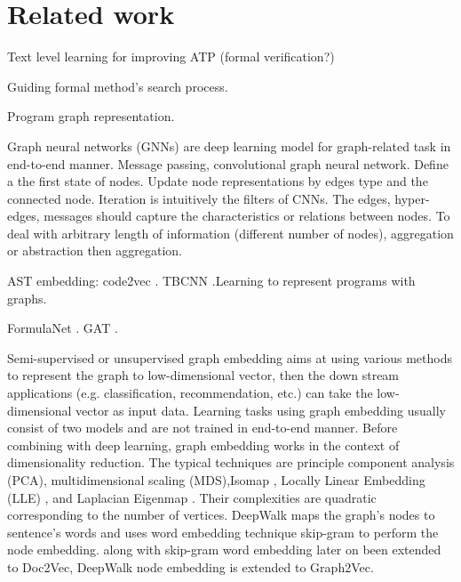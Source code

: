 \documentclass{article}
\begin{document}
\section{Related work}

Text level learning for improving ATP (formal verification?) \cite{NIPS2016_6280}

Guiding formal method's search process.

Program graph representation.

Graph neural networks (GNNs) are deep learning model for graph-related task in end-to-end manner. Message passing, convolutional graph neural network.
Define a the first state of nodes. Update node representations by edges type and the connected node. Iteration is intuitively the filters of CNNs.
The edges, hyper-edges, messages should capture the characteristics or relations between nodes.
To deal with arbitrary length of information (different number of nodes), aggregation or abstraction then aggregation.

AST embedding: code2vec \cite{Alon:2019:CLD:3302515.3290353}. TBCNN \cite{DBLP:journals/corr/MouLJZW14}.Learning to represent programs with graphs\cite{DBLP:journals/corr/abs-1711-00740}.


FormulaNet \cite{NIPS2017_6871}. GAT \cite{2017arXiv171010903V}.

Semi-supervised or unsupervised graph embedding aims at using various methods to represent the graph to low-dimensional vector, then the down stream applications (e.g. classification, recommendation, etc.) can take the low-dimensional vector as input data. Learning tasks using graph embedding usually consist of two models and are not trained in end-to-end manner.
Before combining with deep learning, graph embedding works in the context of dimensionality reduction.
The typical techniques are principle component analysis (PCA), multidimensional scaling (MDS),Isomap \cite{Isomap}, Locally Linear Embedding (LLE) \cite{Roweis2323}, and Laplacian Eigenmap \cite{NIPS2001_1961}. Their complexities are quadratic corresponding to the number of vertices.
DeepWalk maps the graph's nodes to sentence's words and uses word embedding technique skip-gram to perform the node embedding. along with skip-gram word embedding later on been extended to Doc2Vec, DeepWalk node embedding is extended to Graph2Vec.




%
%
%
%
\end{document}
